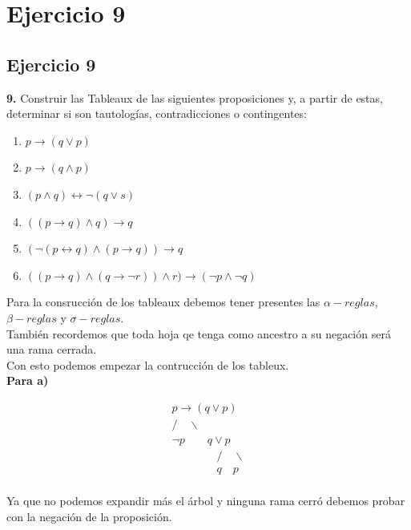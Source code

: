 \chapter*{Ejercicio 9}
\section*{Ejercicio 9}

\textbf{9.} Construir las Tableaux de las siguientes proposiciones y, a partir de estas, determinar si son tautologías, contradicciones o contingentes:\\
\newline
\begin{enumerate}
\renewcommand{\theenumi}{\alph{enumi}} %
    \item $p \rightarrow (q \lor p)$
    \item $p \rightarrow (q \land p)$
    \item $(p \land q) \leftrightarrow \neg(q \lor s)$
    \item $((p \rightarrow q)\land q) \rightarrow q$
    \item $(\neg(p \leftrightarrow q) \land (p \rightarrow q)) \rightarrow q$
    \item $((p \rightarrow q)\land (q \rightarrow \neg r)) \land r) \rightarrow (\neg p \land \neg q) $
\end{enumerate}
Para la consrucción de los tableaux debemos tener presentes las $\alpha-reglas$, $\beta-reglas$ y $\sigma-reglas$.\\
También recordemos que toda hoja qe tenga como ancestro a su negación será una rama cerrada.\\
\newline 
Con esto podemos empezar la contrucción de los tableux.\\
\newline
\textbf{Para a)}
\begin{center}
\[
\begin{array}{c}
p \rightarrow (q \lor p)\\
/ \quad \backslash\\
\neg p \quad \quad q \lor p\\
\quad \quad \quad \quad / \quad \backslash\\
\quad \quad \quad \quad q \quad p \\
\end{array}
\]
\end{center}
Ya que no podemos expandir más el árbol y ninguna rama cerró debemos probar con la negación de la proposición.

